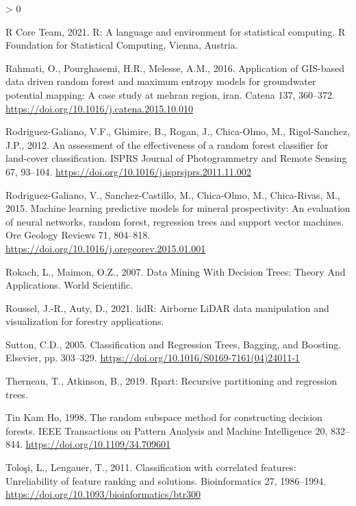 \documentclass[
]{article}
\newlength{\cslhangindent}
\newenvironment{CSLReferences}[2] %
 {%
  \setlength{\parindent}{0pt}
  \ifodd #1 \everypar{\setlength{\hangindent}{\cslhangindent}}\ignorespaces\fi
  \ifnum #2 > 0
  \setlength{\parskip}{#2\baselineskip}
  \fi
 }%
 {}
\begin{document}
\begin{CSLReferences}{1}{0}
\leavevmode\hypertarget{ref-R-base}{}%
R Core Team, 2021. R: A language and environment for statistical computing. R Foundation for Statistical Computing, Vienna, Austria.

\leavevmode\hypertarget{ref-rahmati2016}{}%
Rahmati, O., Pourghasemi, H.R., Melesse, A.M., 2016. Application of GIS-based data driven random forest and maximum entropy models for groundwater potential mapping: A case study at mehran region, iran. Catena 137, 360--372. \url{https://doi.org/10.1016/j.catena.2015.10.010}

\leavevmode\hypertarget{ref-rodriguez-galiano2012}{}%
Rodriguez-Galiano, V.F., Ghimire, B., Rogan, J., Chica-Olmo, M., Rigol-Sanchez, J.P., 2012. An assessment of the effectiveness of a random forest classifier for land-cover classification. ISPRS Journal of Photogrammetry and Remote Sensing 67, 93--104. \url{https://doi.org/10.1016/j.isprsjprs.2011.11.002}

\leavevmode\hypertarget{ref-rodriguez-galiano2015}{}%
Rodriguez-Galiano, V., Sanchez-Castillo, M., Chica-Olmo, M., Chica-Rivas, M., 2015. Machine learning predictive models for mineral prospectivity: An evaluation of neural networks, random forest, regression trees and support vector machines. Ore Geology Reviews 71, 804--818. \url{https://doi.org/10.1016/j.oregeorev.2015.01.001}

\leavevmode\hypertarget{ref-rokach2007}{}%
Rokach, L., Maimon, O.Z., 2007. Data Mining With Decision Trees: Theory And Applications. World Scientific.

\leavevmode\hypertarget{ref-R-lidR}{}%
Roussel, J.-R., Auty, D., 2021. lidR: Airborne LiDAR data manipulation and visualization for forestry applications.

\leavevmode\hypertarget{ref-sutton2005a}{}%
Sutton, C.D., 2005. Classification and Regression Trees, Bagging, and Boosting. Elsevier, pp. 303--329. \url{https://doi.org/10.1016/S0169-7161(04)24011-1}

\leavevmode\hypertarget{ref-R-rpart}{}%
Therneau, T., Atkinson, B., 2019. Rpart: Recursive partitioning and regression trees.

\leavevmode\hypertarget{ref-tinkamho1998}{}%
Tin Kam Ho, 1998. The random subspace method for constructing decision forests. IEEE Transactions on Pattern Analysis and Machine Intelligence 20, 832--844. \url{https://doi.org/10.1109/34.709601}

\leavevmode\hypertarget{ref-toloi2011}{}%
Toloşi, L., Lengauer, T., 2011. Classification with correlated features: Unreliability of feature ranking and solutions. Bioinformatics 27, 1986--1994. \url{https://doi.org/10.1093/bioinformatics/btr300}


\end{CSLReferences}
\end{document}
